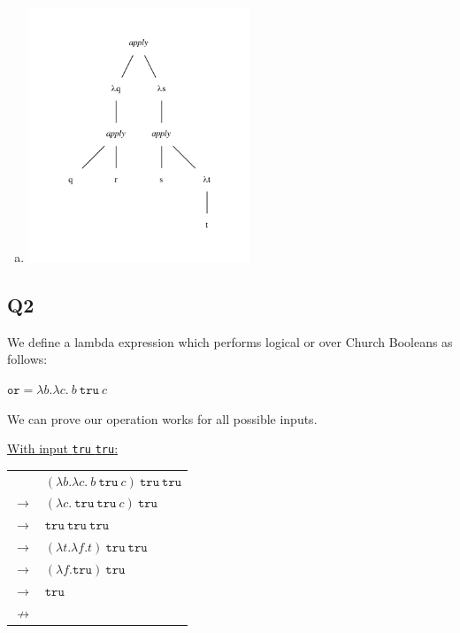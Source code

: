 \documentclass[12pt, fleqn]{article}
\begin{document}
\begin{enumerate}[(a)]
    \item
    \begin{center}
        \includegraphics[width=0.52\textwidth]{b1.pdf}
    \end{center} 

\end{enumerate}

\subsection{Q2}
We define a lambda expression which performs logical or over Church Booleans as follows:
\begin{center}
    $\texttt{or} = \lambda b. \lambda c.\:b\:\texttt{tru}\:c$
\end{center}
We can prove our operation works for all possible inputs.

\medskip

\underline{With input \texttt{tru} \texttt{tru}:}
\begin{center}
    \begin{tabular}{c l}
    & $(\lambda b. \lambda c.\:b\:\texttt{tru}\:c)\:\texttt{tru}\:\texttt{tru}$ \\ 
    $\rightarrow$ & $(\lambda c.\:\texttt{tru}\:\texttt{tru}\:c)\:\texttt{tru}$ \\
    $\rightarrow$ & $\texttt{tru}\:\texttt{tru}\:\texttt{tru}$ \\
    $\rightarrow$ & $(\lambda t. \lambda f. t)\:\texttt{tru}\:\texttt{tru}$ \\
    $\rightarrow$ & $(\lambda f. \texttt{tru})\:\texttt{tru}$ \\
    $\rightarrow$ & $\texttt{tru}$ \\
    $\nrightarrow$ & \\
    \end{tabular}
\end{center}
    
\end{document}
